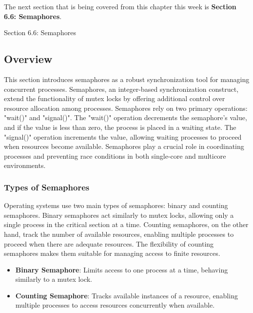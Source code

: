 The next section that is being covered from this chapter this week is \textbf{Section 6.6: Semaphores}.

\begin{notes}{Section 6.6: Semaphores}
    \subsection*{Overview}

    This section introduces semaphores as a robust synchronization tool for managing concurrent processes. Semaphores, an integer-based synchronization construct, extend the functionality of mutex 
    locks by offering additional control over resource allocation among processes. Semaphores rely on two primary operations: "wait()" and "signal()". The "wait()" operation decrements the semaphore's 
    value, and if the value is less than zero, the process is placed in a waiting state. The "signal()" operation increments the value, allowing waiting processes to proceed when resources become 
    available. Semaphores play a crucial role in coordinating processes and preventing race conditions in both single-core and multicore environments.
    
    \subsubsection*{Types of Semaphores}
    
    Operating systems use two main types of semaphores: binary and counting semaphores. Binary semaphores act similarly to mutex locks, allowing only a single process in the critical section at a time. 
    Counting semaphores, on the other hand, track the number of available resources, enabling multiple processes to proceed when there are adequate resources. The flexibility of counting semaphores makes 
    them suitable for managing access to finite resources.
    
    \begin{highlight}
    
        \begin{itemize}
            \item \textbf{Binary Semaphore}: Limits access to one process at a time, behaving similarly to a mutex lock.
            \item \textbf{Counting Semaphore}: Tracks available instances of a resource, enabling multiple processes to access resources concurrently when available.
        \end{itemize}
    

\end{highlight}
\end{notes}
